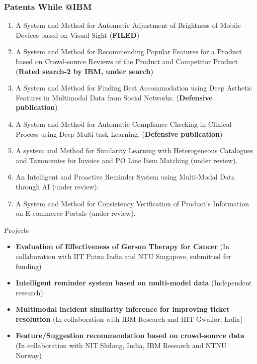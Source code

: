 \documentclass[blue]{beamer}
\begin{document}
\begin{frame}[shrink=20]
\footnotesize
\frametitle{Patents While @IBM}

\begin{enumerate} 
\item A System and Method for Automatic Adjustment of Brightness of Mobile Devices based on Visual Sight ({\bf  FILED})

\item A System and Method for Recommending Popular Features for a Product based on Crowd-source Reviews of the Product and Competitor Product  ({\bf Rated search-2 by IBM, under search}) 


\item A System and Method for Finding Best Accommodation using Deep Asthetic Features in Multimodal Data from Social Networks. ({\bf Defensive publication})

\item A System and Method for Automatic  Compliance Checking in Clinical Process using Deep Multi-task Learning. ({\bf  Defensive publication})

\item A system and Method for Similarity Learning with Heterogeneous Catalogues and Taxonomies for Invoice and PO Line Item Matching (under review).
\item  An Intelligent and Proactive Reminder System using Multi-Modal Data through AI (under review).

\item 
A System and Method for Consistency Verification of Product’s Information on E-commerce Portals (under review).
\end{enumerate}
\end{frame}


\begin{frame}{Projects}

\begin{itemize}
\item {\bf Evaluation of Effectiveness of Gerson Therapy for Cancer} (In collaboration with IIT Patna India and NTU Singapore, submitted for funding)

\item  {\bf Intelligent reminder system based on multi-model data} (Independent research)
\item  {\bf Multimodal incident similarity inference for improving ticket resolution}
(In collaboration with IBM Research and IIIT Gwalior, India)
\item {\bf  Feature/Suggestion recommendation based on crowd-source data}
(In collaboration with NIT Shilong, India, IBM Research and NTNU Norway)

\end{itemize}
\end{frame}
\end{document}
